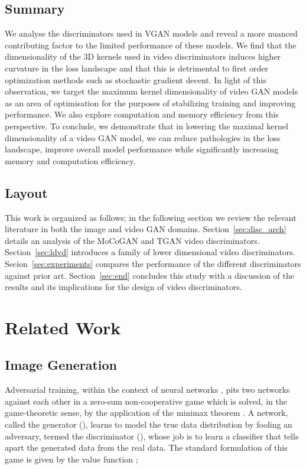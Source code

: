 \documentclass[a4paper,fleqn]{cas-sc}
\begin{document}
\subsection{Summary}
We analyse the discriminators used in VGAN models and reveal a more nuanced contributing factor to the limited performance of these models. We find that the dimensionality of the 3D kernels used in video discriminators induces higher curvature in the loss landscape and that this is detrimental to first order optimization methods such as stochastic gradient decent. In light of this observation, we target the maximum kernel dimensionality of video GAN models as an area of optimisation for the purposes of stabilizing training and improving performance. We also explore computation and memory efficiency from this perspective. To conclude, we demonstrate that in lowering the maximal kernel dimensionality of a video GAN model, we can reduce pathologies in the loss landscape, improve overall model performance while significantly increasing memory and computation efficiency.


\subsection{Layout}
This work is organized as follows; in the following section we review the relevant literature in both the image and video GAN domains. Section~\ref{sec:disc_arch} details an analysis of the MoCoGAN and TGAN video discriminators. Section~\ref{sec:ldvd} introduces a family of lower dimensional video discriminators. Secion~\ref{sec:experiments} compares the performance of the different discriminators against prior art. Section~\ref{sec:end} concludes this study with a discussion of the results and its implications for the design of video discriminators.


\section{Related Work}
\label{sec:related}
\subsection{Image Generation}
Adversarial training, within the context of neural networks \cite{GoodfellowPMXWOCB14generative}, pits two networks against each other in a zero-sum non-cooperative game which is solved, in the game-theoretic sense, by the application of the minimax theorem \cite{vNeumann1928}. A network, called the generator (), learns to model the true data distribution by fooling an adversary, termed the discriminator (), whose job is to learn a classifier that tells apart the generated data from the real data. The standard formulation of this game is given by the value function ;
\end{document}
